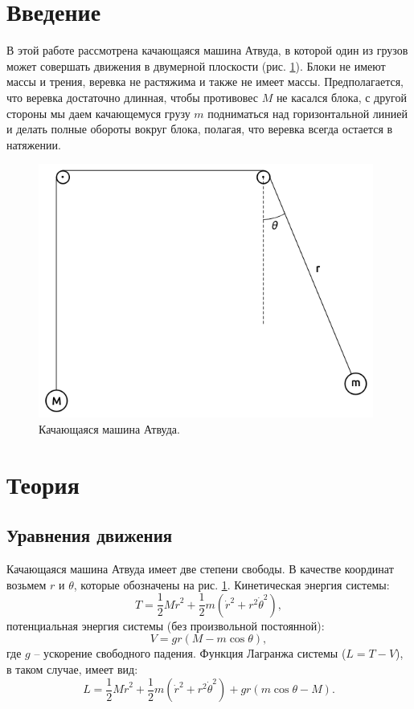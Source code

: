 \documentclass[12pt]{article}
\numberwithin{equation}{section}
\begin{document}
\tableofcontents
\clearpage

\section{Введение}
В этой работе рассмотрена качающаяся машина Атвуда, в которой один из грузов может совершать движения в двумерной плоскости (рис. \ref{atwood}). Блоки не имеют массы и трения, веревка не растяжима и также не имеет массы. Предполагается, что веревка достаточно длинная, чтобы противовес $M$ не касался блока, с другой стороны мы даем качающемуся грузу $m$ подниматься над горизонтальной линией и делать полные обороты вокруг блока, полагая, что веревка всегда остается в натяжении.

\begin{figure}[H]
    \centering
    \includegraphics[width=11cm]{atw.png}
    \caption{Качающаяся машина Атвуда.}
    \label{atwood}
\end{figure}



\section{Теория}
\subsection{Уравнения движения}
Качающаяся машина Атвуда имеет две степени свободы. В качестве координат возьмем $r$ и $\theta$, которые обозначены на рис. \ref{atwood}. Кинетическая энергия системы:
\begin{equation}\label{f1}
T=\frac{1}{2}M\dot{r}^{2}+\frac{1}{2}m (\dot{r}^{2}+r^{2}\dot{\theta}^{2}),
\end{equation}
потенциальная энергия системы (без произвольной постоянной):
\begin{equation}\label{f2}
V=gr(M-m \cos \theta),
\end{equation}
где $g$ -- ускорение свободного падения. Функция Лагранжа системы ($L=T-V$), в таком случае, имеет вид:
\begin{equation}\label{f3}
L=\frac{1}{2}M\dot{r}^{2}+\frac{1}{2}m (\dot{r}^{2}+r^{2}\dot{\theta}^{2})+gr(m \cos \theta-M).
\end{equation}
\end{document}

